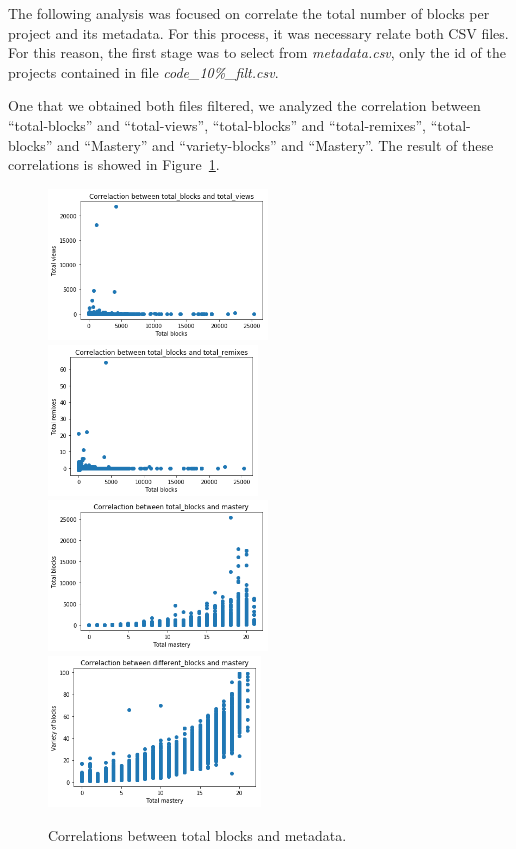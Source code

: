 \documentclass[a4paper,twocolumn,10pt]{article}
\begin{document}
The following analysis was focused on correlate the total number of blocks per project
and its metadata. For this process, it was necessary relate both CSV files. For this
reason, the first stage was to select from \textit{metadata.csv}, only the id of the
projects contained in file \textit{code\_10\%\_filt.csv}.

One that we obtained both files filtered, we analyzed the correlation between 
``total-blocks'' and ``total-views'', ``total-blocks'' and ``total-remixes'', 
``total-blocks'' and ``Mastery'' and ``variety-blocks'' and ``Mastery''. The result
of these correlations is showed in Figure~\ref{tab:corr_2}.

\begin{figure}
\begin{center}
\includegraphics[height=4cm]{images/3.png}
\includegraphics[height=4cm]{images/4.png}
\includegraphics[height=4cm]{images/5.png}
\includegraphics[height=4cm]{images/6.png}
\caption{Correlations between total blocks and metadata.}
\label{tab:corr_2}
\end{center}
\end{figure}
\end{document}
